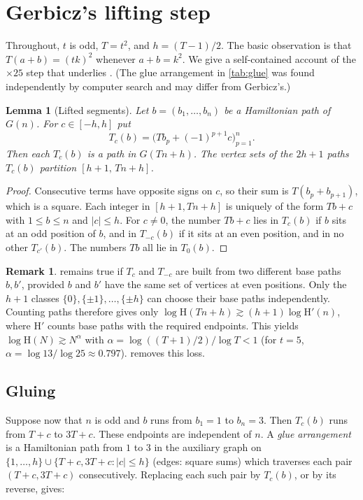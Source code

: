 \documentclass[11pt]{amsart}
\newtheorem{lemma}[theorem]{Lemma}
\theoremstyle{definition}
\newtheorem{remark}[theorem]{Remark}
\newcommand{\Ham}{\mathrm{H}}
\begin{document}
\section{Gerbicz's lifting step}\label{sec:lift}

Throughout, $t$ is odd, $T=t^2$, and $h=(T-1)/2$. The basic observation is that
$T(a+b)=(tk)^2$ whenever $a+b=k^2$. We give a self-contained account of the
$\times25$ step that underlies \cite{Gerbicz}. (The glue arrangement in
\cref{tab:glue} was found independently by computer search and may differ from
Gerbicz's.)

\begin{lemma}[Lifted segments]\label{lem:segments}
Let $b=(b_1,\dots,b_n)$ be a Hamiltonian path of $G(n)$. For $c\in[-h,h]$ put
\[
  T_c(b)=\bigl(T b_p+(-1)^{p+1}c\bigr)_{p=1}^n .
\]
Then each $T_c(b)$ is a path in $G(Tn+h)$. The vertex sets of the $2h+1$ paths
$T_c(b)$ partition $[h+1,\,Tn+h]$.
\end{lemma}

\begin{proof}
Consecutive terms have opposite signs on $c$, so their sum is
$T(b_p+b_{p+1})$, which is a square. Each integer in $[h+1,Tn+h]$ is uniquely of the
form $Tb+c$ with $1\le b\le n$ and $|c|\le h$. For $c\ne0$, the number $Tb+c$ lies in
$T_c(b)$ if $b$ sits at an odd position of $b$, and in $T_{-c}(b)$ if it sits at an even
position, and in no other $T_{c'}(b)$. The numbers $Tb$ all lie in $T_0(b)$.
\end{proof}

\begin{remark}\label{rem:pairs}
 remains true if $T_c$ and $T_{-c}$ are built from two different
base paths $b,b'$, provided $b$ and $b'$ have the same set of vertices at even
positions. Only the $h+1$ classes $\{0\},\{\pm1\},\dots,\{\pm h\}$ can choose
their base paths independently. Counting paths therefore gives only
$\log\Ham(Tn+h)\gtrsim (h+1)\log\Ham'(n)$, where $\Ham'$ counts base paths with the
required endpoints. This yields $\log\Ham(N)\gtrsim N^{\alpha}$ with
$\alpha=\log((T+1)/2)/\log T<1$ (for $t=5$, $\alpha=\log13/\log25\approx0.797$).
 removes this loss.
\end{remark}

\subsection{Gluing}
Suppose now that $n$ is odd and $b$ runs from $b_1=1$ to $b_n=3$. Then $T_c(b)$ runs from
$T+c$ to $3T+c$. These endpoints are independent of $n$. A \emph{glue
arrangement} is a Hamiltonian path from $1$ to $3$ in the auxiliary graph on
$\{1,\dots,h\}\cup\{T+c,3T+c:|c|\le h\}$ (edges: square sums) which traverses each
pair $(T+c,3T+c)$ consecutively. Replacing each such pair by $T_c(b)$, or by its reverse,
gives:
\end{document}
